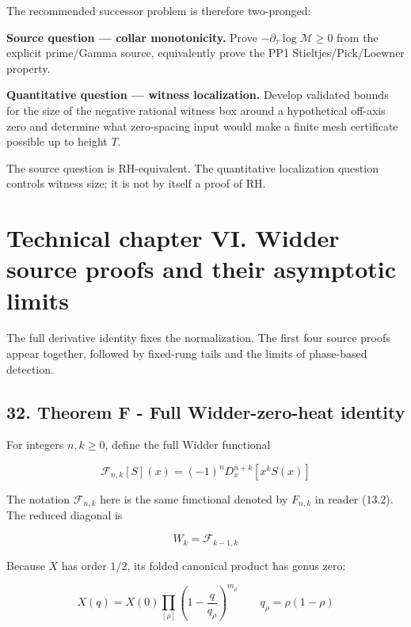\documentclass[
  11pt,
]{book}
\renewenvironment{quote}
  {\begin{tcolorbox}[
      enhanced,
      breakable,
      colback=tncream,
      colframe=tnrust,
      boxrule=0.8pt,
      arc=1.5pt,
      left=7pt,
      right=7pt,
      top=6pt,
      bottom=6pt]}
  {\end{tcolorbox}}
\begin{document}
The recommended successor problem is therefore two-pronged:

\begin{quote}
\textbf{Source question --- collar monotonicity.} Prove
\(-\partial_\tau\log\mathcal M\ge0\) from the explicit prime/Gamma
source, equivalently prove the PP1 Stieltjes/Pick/Loewner property.
\end{quote}

\begin{quote}
\textbf{Quantitative question --- witness localization.} Develop
validated bounds for the size of the negative rational witness box
around a hypothetical off-axis zero and determine what zero-spacing
input would make a finite mesh certificate possible up to height \(T\).
\end{quote}

The source question is RH-equivalent. The quantitative localization
question controls witness size; it is not by itself a proof of RH.


\chapter{Technical chapter VI. Widder source proofs and their asymptotic
limits}\label{technical-chapter-vi.-widder-source-proofs-and-their-asymptotic-limits}

The full derivative identity fixes the normalization. The first four
source proofs appear together, followed by fixed-rung tails and the
limits of phase-based detection.

\section{32. Theorem F - Full Widder-zero-heat
identity}\label{theorem-f---full-widder-zero-heat-identity}

For integers \(n,k\ge0\), define the full Widder functional

\[
\mathcal F_{n,k}[S](x)
=(-1)^nD_x^{n+k}[x^kS(x)]
\]

The notation \(\mathcal F_{n,k}\) here is the same functional denoted by
\(F_{n,k}\) in reader (13.2). The reduced diagonal is

\[
W_k=\mathcal F_{k-1,k}
\]

Because \(X\) has order \(1/2\), its folded canonical product has genus
zero:

\[
X(q)=X(0)
\prod_{[\rho]}
\left(1-\frac q{q_\rho}\right)^{m_\rho}
\qquad
q_\rho=\rho(1-\rho)
\]
\end{document}
